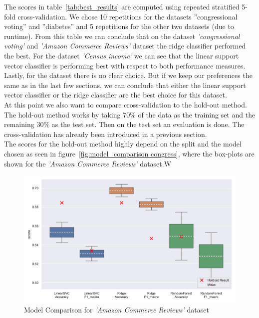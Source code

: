 \documentclass[a4paper,10pt]{article}
\begin{document}
The scores in table~\ref{tab:best_results} are computed using repeated stratified 5-fold
cross-validation. We chose 10 repetitions for the datasets ”congressional voting” and ”diabetes” and 5
repetitions for the other two datasets (due to runtime).
From this table we can conclude that on the dataset \textit{'congressional voting'} and 
\textit{'Amazon Commerce Reviews'} dataset the ridge classifier
performed the best. For the dataset \textit{'Census income'} we can see that
the linear support vector classifier is performing best with respect to both performance measures. Lastly,
for the  dataset there is no clear choice. But if we keep our preferences the same as in the
last few sections, we can conclude that either the linear support vector classifier or the ridge classifier
are the best choice for this dataset. \\
At this point we also want to compare cross-validation to the hold-out method. 
The hold-out method works by taking 70\% of the data as the training set and the remaining 30\% as the test set.
Then on the test set an evaluation is done. The cross-validation has already been introduced in a previous section.\\
The scores for the hold-out method
highly depend on the split and the model chosen as seen in figure~\ref{fig:model_comparison congress},
where the box-plots are shown for the
\textit{'Amazon Commerce Reviews'} dataset.W



\begin{figure}[h!]
\centering
\includegraphics[width=\textwidth]{amazon/plots/model_comparison.pdf}
\caption{Model Comparison for \textit{'Amazon Commerce Reviews'} dataset}
\label{fig:model_comparison amazon}
\end{figure}
\end{document}
